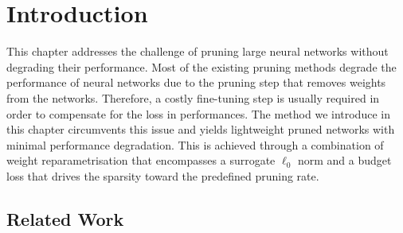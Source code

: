 \section{Introduction}

This chapter addresses the challenge of pruning large neural networks without
degrading their performance. Most of the  existing pruning methods degrade the
performance of neural networks due to the pruning step that removes weights from
the networks. Therefore, a costly fine-tuning step is usually required in order
to compensate for the loss in performances. The method we introduce in this
chapter circumvents this issue and yields lightweight pruned networks with
minimal performance degradation. This is achieved through a combination of
weight reparametrisation that encompasses  a surrogate $\ell_0$ norm and a budget
loss that drives the sparsity toward the predefined pruning rate.



\subsection{Related Work}

